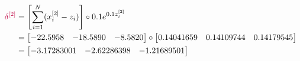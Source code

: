 \documentclass[12pt]{article}
\begin{document}
\begin{enumerate}[leftmargin=\labelsep]
        \begin{equation*}
          \begin{aligned}
            \textcolor{purple}{\delta^{[2]}} & = \left[\sum_{i=1}^N(x_i^{[2]} - z_i)\right] \circ 0.1e^{0.1z_i^{[2]}} \\
                                             & = \begin{bmatrix}
                                                   -22.5958 & -18.5890 & -8.5820 \\
                                                 \end{bmatrix} \circ \begin{bmatrix}
                                                                       0.14041659 & 0.14109744 & 0.14179545 \\
                                                                     \end{bmatrix}             \\
                                             & = \begin{bmatrix}
                                                   -3.17283001 & -2.62286398 & -1.21689501 \\
                                                 \end{bmatrix}
          \end{aligned}
        \end{equation*}


\end{enumerate}
\end{document}
